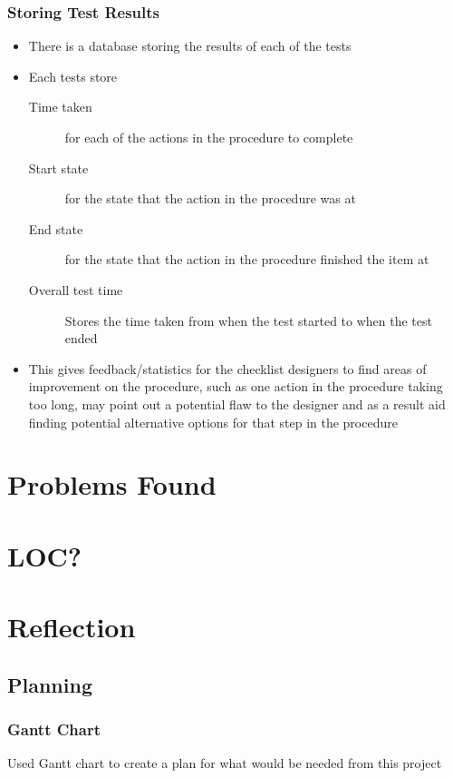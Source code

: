 \documentclass[../dissertation.tex]{subfiles}
\begin{document}
\subsubsection{Storing Test Results}
\begin{itemize}
  \item There is a database storing the results of each of the tests
  \item Each tests store
  \begin{description}
    \item[Time taken] for each of the actions in the procedure to complete
    \item[Start state] for the state that the action in the procedure was at
    \item[End state] for the state that the action in the procedure finished
      the item at
    \item[Overall test time] Stores the time taken from when the test started
      to when the test ended
  \end{description}
  \item This gives feedback/statistics for the checklist designers
    to find areas of improvement on the procedure, such as one action
    in the procedure taking too long, may point out a potential flaw
    to the designer and as a result aid finding potential alternative
    options for that step in the procedure
\end{itemize}

\section{Problems Found}


\section{LOC?}


\section{Reflection}
\subsection{Planning}
\subsubsection{Gantt Chart}
Used Gantt chart to create a plan for what would be needed from this project
\end{document}
